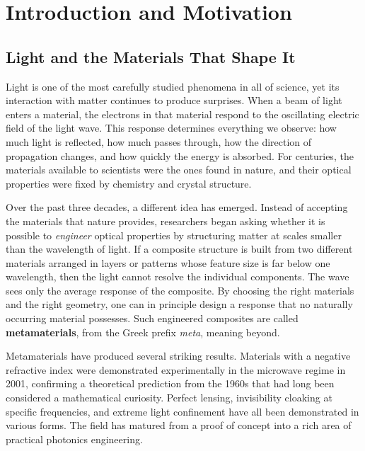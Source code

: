 
\chapter{Introduction and Motivation}
\label{ch:introduction}

\section{Light and the Materials That Shape It}

Light is one of the most carefully studied phenomena in all of science, yet
its interaction with matter continues to produce surprises. When a beam of
light enters a material, the electrons in that material respond to the
oscillating electric field of the light wave. This response determines
everything we observe: how much light is reflected, how much passes through,
how the direction of propagation changes, and how quickly the energy is
absorbed. For centuries, the materials available to scientists were the ones
found in nature, and their optical properties were fixed by chemistry and
crystal structure.

Over the past three decades, a different idea has emerged. Instead of
accepting the materials that nature provides, researchers began asking whether
it is possible to \emph{engineer} optical properties by structuring matter at
scales smaller than the wavelength of light. If a composite structure is built
from two different materials arranged in layers or patterns whose feature size
is far below one wavelength, then the light cannot resolve the individual
components. The wave sees only the average response of the composite. By
choosing the right materials and the right geometry, one can in principle
design a response that no naturally occurring material possesses. Such
engineered composites are called \textbf{metamaterials}, from the Greek prefix
\emph{meta}, meaning beyond.

Metamaterials have produced several striking results. Materials with a
negative refractive index were demonstrated experimentally in the microwave
regime in 2001, confirming a theoretical prediction from the 1960s that had
long been considered a mathematical curiosity. Perfect lensing, invisibility
cloaking at specific frequencies, and extreme light confinement have all been
demonstrated in various forms. The field has matured from a proof of concept
into a rich area of practical photonics engineering.

